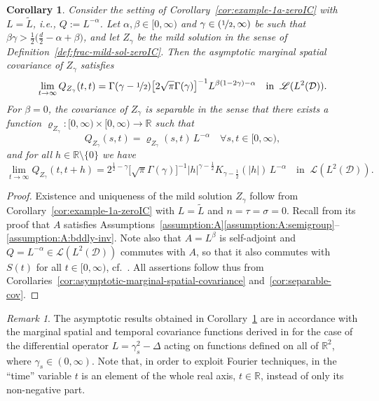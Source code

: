 \documentclass[reqno]{amsart}
\numberwithin{equation}{section}
\newcommand{\R}{\mathbb{R}}
\newcommand{\cD}{\mathcal{D}}
\newtheorem{corollary}[lemma]{Corollary}
\theoremstyle{remark}
\newtheorem{remark}[lemma]{Remark}
\theoremstyle{definition}
\begin{document}
\begin{corollary}\label{cor:example-1a-covariance}
	Consider the setting of Corollary~\textup{\ref{cor:example-1a-zeroIC}} 
	with $L=\widetilde{L}$, i.e., ${Q := L^{-\alpha}}$\!. 
	Let  
	$\alpha,\beta\in [0,\infty)$ and  
	$\gamma \in (\nicefrac{1}{2},\infty)$
	be such that
	$\beta\gamma > \frac{1}{2}\bigl( \frac{d}{2} - \alpha +\beta\bigr)$, 
	and let $Z_\gamma$ be the mild solution 
	in the sense of Definition~\textup{\ref{def:frac-mild-sol-zeroIC}}. 
	Then the asymptotic marginal spatial covariance
	of $Z_\gamma$ 
	satisfies
	\[ 
	\lim_{t\to\infty} Q_{Z_\gamma}(t,t) 
	= 
	\Gamma(\gamma-\nicefrac{1}{2})
	\bigl[ 2\sqrt{\pi} \Gamma(\gamma) \bigr]^{-1} 
	L^{\beta(1-2\gamma)-\alpha} 
	\quad 
	\text{in}\;\;
	\mathscr L(L^2(\cD)). 
	\] 
	For $\beta = 0$, 
	the covariance of $Z_\gamma$ is separable
	in the sense that
	there exists a function 
	$\varrho_{Z_\gamma}\colon [0,\infty)\times[0,\infty) \to \R$
	such that 
	\[ 
	Q_{Z_\gamma}(s,t) 
	=
	\varrho_{Z_\gamma}(s,t) \, L^{-\alpha}
	\quad 
	\forall s,t\in[0,\infty), 
	\] 
	and for all $h \in \R \setminus \{0\}$ we have
	\[ 
	\lim_{t\to\infty}Q_{Z_\gamma}(t,t+h)
	= 
	2^{\frac{1}{2}-\gamma}
	\bigl[ \sqrt{\pi}\Gamma(\gamma) \bigr]^{-1}
	|h|^{\gamma-\frac{1}{2}} 
	K_{\gamma-\frac{1}{2}}(|h|)\, L^{-\alpha}
	\quad 
	\text{in}\;\; 
	\mathscr L(L^2(\cD)). 
	\] 
\end{corollary}


\begin{proof}
	Existence and uniqueness of the mild
	solution $Z_\gamma$ follow from Corollary~\ref{cor:example-1a-zeroIC}
	with $L = \widetilde L$ and $n = \tau = \sigma = 0$.
	Recall from its proof that $A$ satisfies
	Assumptions~\ref{assumption:A}\ref{assumption:A:semigroup}--\ref{assumption:A:bddly-inv}.
	Note also that $A = L^\beta$ is self-adjoint
	and $Q = L^{-\alpha}\in \mathscr L(L^2(\cD))$ 
	commutes with $A$, so that 
	it also commutes with $S(t)$ 
	for all $t \in [0,\infty)$,
	cf.\ \cite[Theorem~1.3.2(a)]{Haase2006}.
	All assertions follow thus 
	from Corollaries~\ref{cor:asymptotic-marginal-spatial-covariance}
	and~\ref{cor:separable-cov}.
\end{proof}


\begin{remark} 
	The asymptotic results obtained in 
	Corollary~\ref{cor:example-1a-covariance} 
	are in accordance with the marginal  
	spatial and temporal covariance functions 
	derived 
	in \cite[Section~3, Proposition~1 and Corollary~1]{Bakka2023diffusionbased} 
	for the case of the differential operator 
	$L= \gamma_s^2 - \Delta$ 
	acting on functions defined on all of $\R^2$\!, 
	where $\gamma_s\in(0,\infty)$. 
	Note that, in order to exploit 
	Fourier techniques, 
	in \cite{Bakka2023diffusionbased} the ``time'' variable  
	$t$ is an element of the whole real axis, $t\in\R$,  
	instead of only its non-negative part. 
\end{remark} 
\end{document}
